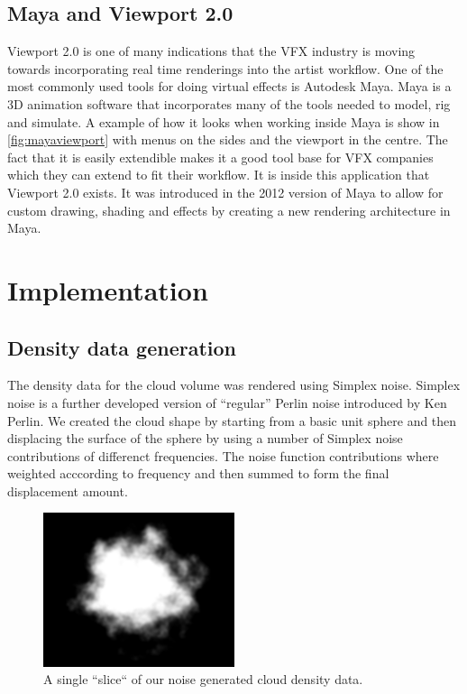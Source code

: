 \documentclass[11pt,twocolumn]{article}
\begin{document}
\subsection{Maya and Viewport 2.0}
Viewport 2.0 is one of many indications that the VFX industry is moving towards incorporating real time renderings into the artist workflow.
One of the most commonly used tools for doing virtual effects is Autodesk Maya.
Maya is a 3D animation software that incorporates many of the tools needed to model, rig and simulate.
A example of how it looks when working inside Maya is show in \autoref{fig:mayaviewport} with menus on the sides and the viewport in the centre.
The fact that it is easily extendible makes it a good tool base for VFX companies which they can extend to fit their workflow.
It is inside this application that Viewport 2.0 exists.
It was introduced in the 2012 version of Maya to allow for custom drawing, shading and effects by creating a new rendering architecture in Maya.

\section{Implementation}
\subsection{Density data generation}
The density data for the cloud volume was rendered using Simplex noise. Simplex noise is a further developed version of ``regular'' Perlin noise introduced by Ken Perlin. We created the cloud shape by starting from a basic unit sphere and then displacing the surface of the sphere by using a number of Simplex noise contributions of differenct frequencies. The noise function contributions where weighted acccording to frequency and then summed to form the final displacement amount.
\begin{figure}[ht]
\includegraphics[width=0.5\textwidth]{figures/cumulus_slice.png}
\caption{A single ``slice`` of our noise generated cloud density data.}
\label{fig:cloud_slice}
\end{figure}
\end{document}
